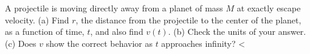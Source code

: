 A projectile is moving directly away from a planet of mass $M$ at exactly
        escape velocity. (a) Find $r$, the distance from the projectile to the center
        of the planet, as a function of time, $t$, and also find $v(t)$.\answercheck\hwendpart
        (b) Check the units of your answer.\hwendpart
        (c) Does $v$ show the correct behavior as $t$ approaches infinity?
        <%
